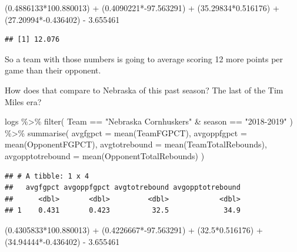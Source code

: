 \documentclass[
]{book}
\newenvironment{Shaded}{\begin{snugshade}}{\end{snugshade}}
\newcommand{\AttributeTok}[1]{\textcolor[rgb]{0.77,0.63,0.00}{#1}}
\newcommand{\FloatTok}[1]{\textcolor[rgb]{0.00,0.00,0.81}{#1}}
\newcommand{\FunctionTok}[1]{\textcolor[rgb]{0.00,0.00,0.00}{#1}}
\newcommand{\NormalTok}[1]{#1}
\newcommand{\SpecialCharTok}[1]{\textcolor[rgb]{0.00,0.00,0.00}{#1}}
\newcommand{\StringTok}[1]{\textcolor[rgb]{0.31,0.60,0.02}{#1}}
\begin{document}
\begin{Shaded}
\begin{Highlighting}[]
\NormalTok{(}\FloatTok{0.4886133}\SpecialCharTok{*}\FloatTok{100.880013}\NormalTok{) }\SpecialCharTok{+}\NormalTok{ (}\FloatTok{0.4090221}\SpecialCharTok{*{-}}\FloatTok{97.563291}\NormalTok{) }\SpecialCharTok{+}\NormalTok{ (}\FloatTok{35.29834}\SpecialCharTok{*}\FloatTok{0.516176}\NormalTok{) }\SpecialCharTok{+}\NormalTok{ (}\FloatTok{27.20994}\SpecialCharTok{*{-}}\FloatTok{0.436402}\NormalTok{) }\SpecialCharTok{{-}} \FloatTok{3.655461}
\end{Highlighting}
\end{Shaded}

\begin{verbatim}
## [1] 12.076
\end{verbatim}

So a team with those numbers is going to average scoring 12 more points per game than their opponent.

How does that compare to Nebraska of this past season? The last of the Tim Miles era?

\begin{Shaded}
\begin{Highlighting}[]
\NormalTok{logs }\SpecialCharTok{\%\textgreater{}\%} 
  \FunctionTok{filter}\NormalTok{(}
\NormalTok{    Team }\SpecialCharTok{==} \StringTok{"Nebraska Cornhuskers"} \SpecialCharTok{\&}\NormalTok{ season }\SpecialCharTok{==} \StringTok{"2018{-}2019"}
\NormalTok{    ) }\SpecialCharTok{\%\textgreater{}\%} 
  \FunctionTok{summarise}\NormalTok{(}
    \AttributeTok{avgfgpct =} \FunctionTok{mean}\NormalTok{(TeamFGPCT), }
    \AttributeTok{avgoppfgpct =} \FunctionTok{mean}\NormalTok{(OpponentFGPCT), }
    \AttributeTok{avgtotrebound =} \FunctionTok{mean}\NormalTok{(TeamTotalRebounds),}
    \AttributeTok{avgopptotrebound =} \FunctionTok{mean}\NormalTok{(OpponentTotalRebounds)}
\NormalTok{    )}
\end{Highlighting}
\end{Shaded}

\begin{verbatim}
## # A tibble: 1 x 4
##   avgfgpct avgoppfgpct avgtotrebound avgopptotrebound
##      <dbl>       <dbl>         <dbl>            <dbl>
## 1    0.431       0.423          32.5             34.9
\end{verbatim}

\begin{Shaded}
\begin{Highlighting}[]
\NormalTok{(}\FloatTok{0.4305833}\SpecialCharTok{*}\FloatTok{100.880013}\NormalTok{) }\SpecialCharTok{+}\NormalTok{ (}\FloatTok{0.4226667}\SpecialCharTok{*{-}}\FloatTok{97.563291}\NormalTok{) }\SpecialCharTok{+}\NormalTok{ (}\FloatTok{32.5}\SpecialCharTok{*}\FloatTok{0.516176}\NormalTok{) }\SpecialCharTok{+}\NormalTok{ (}\FloatTok{34.94444}\SpecialCharTok{*{-}}\FloatTok{0.436402}\NormalTok{) }\SpecialCharTok{{-}} \FloatTok{3.655461}
\end{Highlighting}
\end{Shaded}
\end{document}
